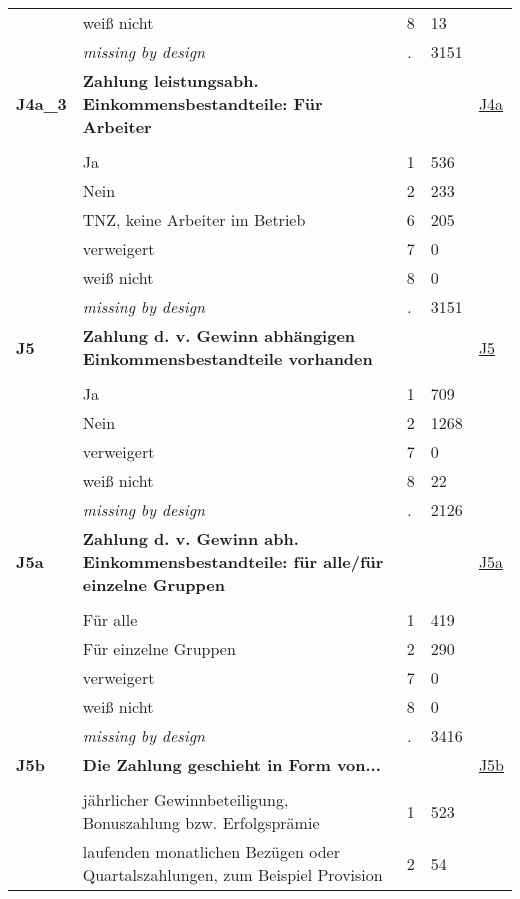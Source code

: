 \begin{longtable}{| L{2.65cm} | L{8cm} | C{1.5cm} | R{1.25cm} | C{2.25cm}  |}
   & weiß nicht & 8 & 13 &  \\ 
   & \textit{missing by design} & \textit{.} & 3151 &  \\ 
   \midrule
\textbf{J4a\_3}\label{var:J4a:3} & \textbf{Zahlung leistungsabh. Einkommensbestandteile: Für Arbeiter} &  &  & \hyperref[J4a]{J4a} \\ 
   &  &  &  &  \\ 
   & Ja & 1 & 536 &  \\ 
   & Nein & 2 & 233 &  \\ 
   & TNZ, keine Arbeiter im Betrieb & 6 & 205 &  \\ 
   & verweigert & 7 & 0 &  \\ 
   & weiß nicht & 8 & 0 &  \\ 
   & \textit{missing by design} & \textit{.} & 3151 &  \\ 
   \midrule
\textbf{J5}\label{var:J5} & \textbf{Zahlung d. v. Gewinn abhängigen Einkommensbestandteile vorhanden} &  &  & \hyperref[J5]{J5} \\ 
   &  &  &  &  \\ 
   & Ja & 1 & 709 &  \\ 
   & Nein & 2 & 1268 &  \\ 
   & verweigert & 7 & 0 &  \\ 
   & weiß nicht & 8 & 22 &  \\ 
   & \textit{missing by design} & \textit{.} & 2126 &  \\ 
   \midrule
\textbf{J5a}\label{var:J5a} & \textbf{Zahlung d. v. Gewinn abh. Einkommensbestandteile: für alle/für einzelne Gruppen} &  &  & \hyperref[J5a]{J5a} \\ 
   &  &  &  &  \\ 
   & Für alle & 1 & 419 &  \\ 
   & Für einzelne Gruppen & 2 & 290 &  \\ 
   & verweigert & 7 & 0 &  \\ 
   & weiß nicht & 8 & 0 &  \\ 
   & \textit{missing by design} & \textit{.} & 3416 &  \\ 
   \midrule
\textbf{J5b}\label{var:J5b} & \textbf{Die Zahlung geschieht in Form von...} &  &  & \hyperref[J5b]{J5b} \\ 
   &  &  &  &  \\ 
   & jährlicher Gewinnbeteiligung, Bonuszahlung bzw. Erfolgsprämie & 1 & 523 &  \\ 
   & laufenden monatlichen Bezügen oder Quartalszahlungen, zum Beispiel Provision & 2 & 54 &  \\ 

\end{longtable}
